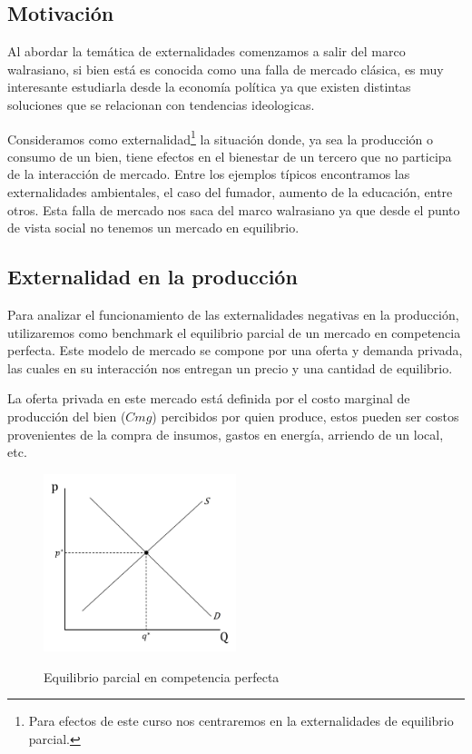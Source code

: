 \subsection{Motivación}
Al abordar la temática de externalidades comenzamos a salir del marco walrasiano, si bien está es conocida como una falla de mercado clásica, es muy interesante estudiarla desde la economía política ya que existen distintas soluciones que se relacionan con tendencias ideologicas.

Consideramos como externalidad\footnote{Para efectos de este curso nos centraremos en la externalidades de equilibrio parcial.} la situación donde, ya sea la producción o consumo de un bien, tiene efectos en el bienestar de un tercero que no participa de la interacción de mercado. Entre los ejemplos típicos encontramos las externalidades ambientales, el caso del fumador, aumento de la educación, entre otros. Esta falla de mercado nos saca del marco walrasiano ya que desde el punto de vista social no tenemos un mercado en equilibrio.

\subsection{Externalidad en la producción}

Para analizar el funcionamiento de las externalidades negativas en la producción, utilizaremos como benchmark el equilibrio parcial de un mercado en competencia perfecta. Este modelo de mercado se compone por una oferta y demanda privada, las cuales en su interacción nos entregan un precio y una cantidad de equilibrio.

La oferta privada en este mercado está definida por el costo marginal de producción del bien ($Cmg$) percibidos por quien produce, estos pueden ser costos provenientes de la compra de insumos, gastos en energía, arriendo de un local, etc. 

\begin{figure}[htbp]
    \centering
    \caption{Equilibrio parcial en competencia perfecta}
    \includegraphics[width=0.5\textwidth]{Figuras/Eq Parcial EXT.jpg}
    \label{fig:Eq parcial}
\end{figure}

